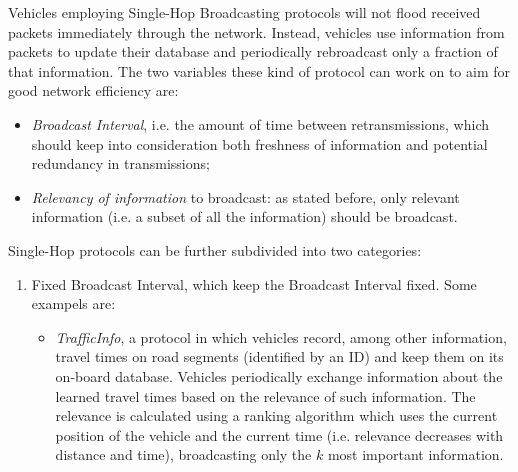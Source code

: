 \begin{enumerate}
			
			Vehicles employing Single-Hop Broadcasting protocols will not flood received packets immediately through the network. Instead, vehicles use information from packets to update their database and periodically rebroadcast only a fraction of that information. The two variables these kind of protocol can work on to aim for good network efficiency are:
			\begin{itemize}
				\item \textit{Broadcast Interval}, i.e. the amount of time between retransmissions, which should keep into consideration both freshness of information and potential redundancy in transmissions;
				\item \textit{Relevancy of information} to broadcast: as stated before, only relevant information (i.e. a subset of all the information) should be broadcast.
			\end{itemize}
			
			Single-Hop protocols can be further subdivided into two categories:
			\begin{enumerate}
				
				\item Fixed Broadcast Interval, which keep the Broadcast Interval fixed. Some exampels are:
				\begin{itemize}
					\renewcommand\labelitemi{--}
					
					\item \textit{TrafficInfo}\cite{4621303}, a protocol in which vehicles record, among other information, travel times on road segments (identified by an ID) and keep them on its on-board database. Vehicles periodically exchange information about the learned travel times based on the relevance of such information. The relevance is calculated using a ranking algorithm which uses the current position of the vehicle and the current time (i.e. relevance decreases with distance and time), broadcasting only the $k$  most important information. 
					

\end{itemize}
\end{enumerate}
\end{enumerate}
